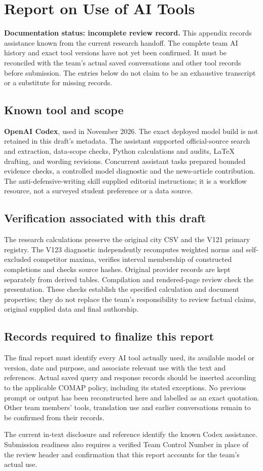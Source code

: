 \section*{Report on Use of AI Tools}
\textbf{Documentation status: incomplete review record.}
This appendix records assistance known from the current research handoff.
The complete team AI history and exact tool versions have not yet been
confirmed. It must be reconciled with the team's actual saved conversations
and other tool records before submission. The entries below do not claim to
be an exhaustive transcript or a substitute for missing records.

\subsection*{Known tool and scope}
\textbf{OpenAI Codex}, used in November 2026. The exact deployed model build
is not retained in this draft's metadata. The assistant supported official-source
search and extraction, data-scope checks, Python calculations and audits,
LaTeX drafting, and wording revisions. Concurrent assistant tasks prepared
bounded evidence checks, a controlled model diagnostic and the news-article
contribution. The anti-defensive-writing skill supplied editorial instructions;
it is a workflow resource, not a surveyed student preference or a data source.

\subsection*{Verification associated with this draft}
The research calculations preserve the original city CSV and the V121 primary
registry. The V123 diagnostic independently recomputes weighted norms and
self-excluded competitor maxima, verifies interval membership of constructed
completions and checks source hashes. Original provider records are kept
separately from derived tables. Compilation and rendered-page review check the
presentation. These checks establish the specified calculation and document
properties; they do not replace the team's responsibility to review factual
claims, original supplied data and final authorship.

\subsection*{Records required to finalize this report}
The final report must identify every AI tool actually used, its available
model or version, date and purpose, and associate relevant use with the text
and references. Actual saved query and response records should be inserted
according to the applicable COMAP policy, including its stated exceptions.
No previous prompt or output has been reconstructed here and labelled as an
exact quotation. Other team members' tools, translation use and earlier
conversations remain to be confirmed from their records.

The current in-text disclosure and reference identify the known Codex
assistance. Submission readiness also requires a verified Team Control Number
in place of the review header and confirmation that this report accounts for
the team's actual use.
